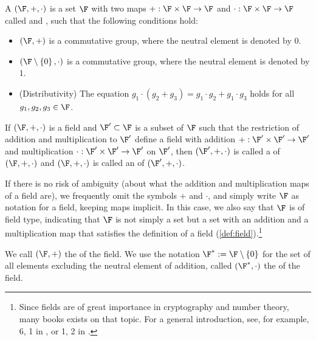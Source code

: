 \begin{definition}[Field]\label{def:field}
A  $ (\F, +, \cdot) $ is a set $\F$  with two maps $ +: \F \times \F \to \F $ and $ \cdot: \F \times \F \to \F $ called  and , such that the following conditions hold:
\begin{itemize}
\item $ \left (\F, + \right) $ is a commutative group, where the neutral element is denoted by $ 0 $.
\item $ \left (\F \setminus \left \{0 \right \}, \cdot \right) $ is a commutative group, where the neutral element is denoted by $ 1 $.
\item (Distributivity) The equation $g_1 \cdot \left (g_2 + g_3 \right) = g_1 \cdot g_2 + g_1 \cdot g_3$  holds for all $ g_1, g_2, g_3 \in \F $.
\end{itemize}
If $(\F,+,\cdot)$ is a field and $\F'\subset \F$ is a subset of $\F$ such that the restriction of addition and multiplication to $\F'$ define a field with addition $+: \F'\times \F' \to \F'$ and multiplication $\cdot: \F'\times \F' \to \F'$ on $\F'$, then $(\F',+,\cdot)$ is called a  of $(\F,+,\cdot)$ and $(\F,+,\cdot)$ is called an  of $(\F',+,\cdot)$.
\end{definition}

\begin{notation} If there is no risk of ambiguity (about what the addition and multiplication maps  of a field are), we frequently omit the symbols $+$ and $\cdot$, and simply write $\F$ as notation for a field, keeping  maps implicit. In this case, we also say that $\F$ is of field type, indicating that $\F$ is not simply a set but a set with an addition and a multiplication map that satisfies the definition of a field (\ref {def:field}).\footnote{Since fields are of great importance in cryptography and number theory, many books exists on that topic. For a general introduction, see, for example, \chaptname{} 6, \secname{} 1 in \cite{mignotte-1992}, or \chaptname{} 1, \secname{} 2 in \cite{nieder-1986}.}

We call $(\F,+)$ the  of the field. We use the notation $\F^*:= \F \setminus \left \{0 \right \}$ for the set of all elements excluding the neutral element of addition, called  $(\F^*,\cdot)$ the  of the field.
\end{notation}


